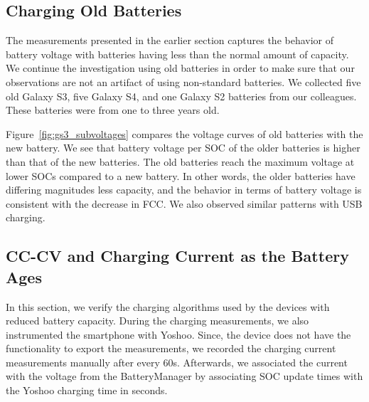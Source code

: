 \documentclass[journal]{IEEEtran}
\begin{document}
\subsection{Charging Old Batteries}
\label{subsec:gs3_charging}












The measurements presented in the earlier section captures the behavior of battery voltage with batteries having less than the normal amount of capacity. We continue the investigation using old batteries in order to make sure that our observations are not an artifact of using non-standard batteries. We collected five old Galaxy S3, five Galaxy S4, and one Galaxy S2 batteries from our colleagues. These batteries were from one to three years old.

Figure~\ref{fig:gs3_subvoltages} compares the voltage curves of old batteries with the new battery. We see that battery voltage per SOC of the older  batteries is higher than that of the new batteries. The old batteries reach the maximum voltage at lower SOCs compared to a new battery. In other words, the older batteries have differing magnitudes less capacity, and the behavior in terms of battery voltage  is consistent with the decrease in FCC. We also observed similar patterns with USB charging. 


















\subsection{CC-CV and Charging Current as the Battery Ages}
\label{subsec:yoshorate}

 
 



In this section, we verify the charging algorithms used by the devices with reduced battery capacity. During the charging measurements, we also instrumented the smartphone with Yoshoo. Since, the device does not have the functionality to export the measurements, we recorded the charging current measurements manually after every 60s. Afterwards, we associated the current with the voltage from the BatteryManager by associating SOC update times with the Yoshoo charging time in seconds. 
\end{document}
